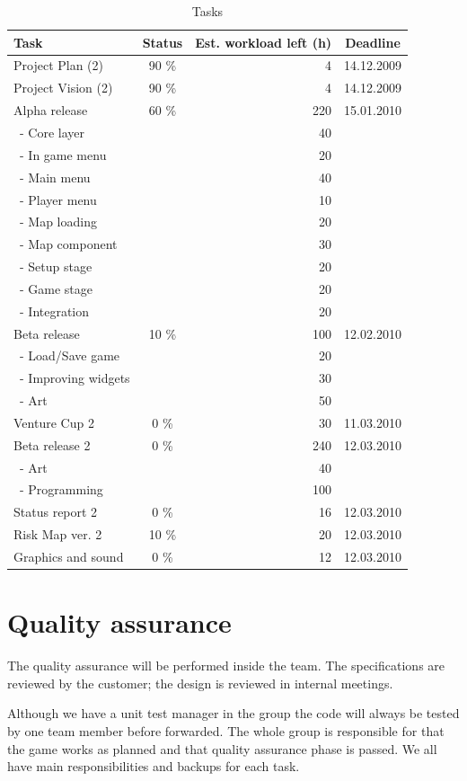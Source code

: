 \documentclass[12pt,a4paper]{article}
\begin{document}
\begin{table}[h!]
\small
\begin{tabular}{ l | c | r | c}
Task				&Status		&Est. workload left (h)	&Deadline \\\hline\hline
Project Plan (2) 	&90	\%		&4					&14.12.2009\\
Project Vision (2)	&90 	\%		&4					&14.12.2009\\
Alpha release		&60 	\%		&220				&15.01.2010\\
\ - Core layer		&			&40					&\\
\ - In game menu	&			&20					&\\
\ - Main menu		&			&40					&\\
\ - Player menu		&			&10					&\\
\ - Map loading		&			&20					&\\
\ - Map component	&			&30					&\\
\ - Setup stage		&			&20					&\\
\ - Game stage		&			&20					&\\
\ - Integration		&			&20					&\\
Beta release		&10 \%		&100				&12.02.2010\\
\ - Load/Save game	&			&20					&\\
\ - Improving widgets	&			&30					&\\
\ - Art				&			&50					&\\
Venture Cup 2		&0 \%		&30					&11.03.2010\\
Beta release 2		&0 \%		&240				&12.03.2010\\
\ - Art				&			&40					&\\
\ - Programming	&			&100				&\\
Status report 2		&0 \%		&16					&12.03.2010\\
Risk Map ver. 2		&10 \%		&20					&12.03.2010\\
Graphics and sound	&0 \%		&12					&12.03.2010
\end{tabular}
\caption{Tasks}
\label{tab:tasks}
\end{table}


\section{Quality assurance}

The quality assurance will be performed inside the team. The
specifications are reviewed by the customer; the design is reviewed in
internal meetings.

Although we have a unit test manager in the group the code will always
be tested by one team member before forwarded. The whole group is
responsible for that the game works as planned and that quality
assurance phase is passed. We all have main responsibilities and
backups for each task.
\end{document}

